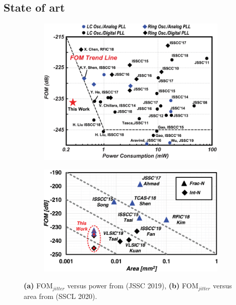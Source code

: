 \subsection{State of art}
	\begin{figure}[htb!]
	    \centering
	    \begin{subfigure}{0.5\textwidth}
	        \centering
	        \includegraphics[width=1\textwidth, angle=0]{./figs/liu24-fom}
	        \caption{ }
	        \label{fig:fom_v_pow}
	    \end{subfigure}%
	    \begin{subfigure}{0.5\textwidth}
	        \centering
	        \includegraphics[width=1\textwidth, angle=0]{./figs/liu_5nm}
	        \caption{ }
	        \label{fig:fom_v_area}
	    \end{subfigure}
	    \caption{\textbf{(a)} FOM$_{jitter}$ versus power from \cite{Liu2019} (JSSC 2019), \textbf{(b)} FOM$_{jitter}$ versus area from \cite{Liu2020} (SSCL 2020).}
	    \label{fig:fom_charts}
	\end{figure}


